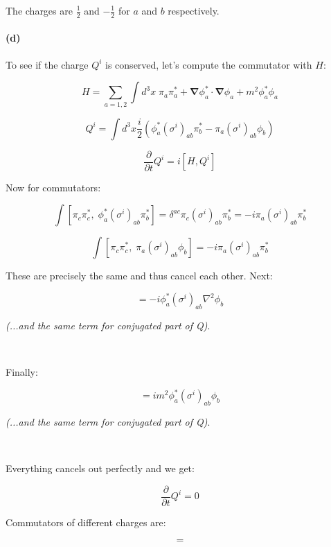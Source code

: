 \documentclass[11pt]{article}
\begin{document}
The charges are $\frac{1}{2}$ and $-\frac{1}{2}$ for $a$ and $b$
respectively.

\pagebreak

\paragraph*{(d)}

To see if the charge $Q^i$ is conserved, let's compute the commutator
with $H$:

\begin{equation}
H = \sum_{a=1,2} \int d^3x \; \pi_a \pi_a^* +
    \mathbf{\nabla} \phi_a^* \cdot \mathbf{\nabla} \phi_a +
    m^2 \phi_a^* \phi_a
\end{equation}
    
\begin{equation}
Q^i = \int d^3x \frac{i}{2} \left(
  \phi_a^* \left( \sigma^i \right)_{ab} \pi_b^* -
  \pi_a \left( \sigma^i \right)_{ab} \phi_b
  \right)
\end{equation}

\begin{equation}
\frac{\partial}{\partial t} Q^i = i [ H, Q^i ]
\end{equation}

Now for commutators:

\begin{equation}
\int
  [ \pi_c \pi^*_c, \; \phi^*_a \left(\sigma^i\right)_{ab} \pi^*_b ] =
  \delta^{ac} \pi_c \left(\sigma^i\right)_{ab} \pi^*_b =
  -i \pi_a \left(\sigma^i\right)_{ab} \pi^*_b
\end{equation}

\begin{equation}
\int
  [ \pi_c \pi^*_c, \; \pi_a \left(\sigma^i\right)_{ab} \phi_b ] =
  -i \pi_a \left(\sigma^i\right)_{ab} \pi^*_b
\end{equation}

These are precisely the same and thus cancel each other. Next:

\begin{equation}
[ \nabla \phi^*_c \cdot \nabla \phi_c,
  \; \phi^*_a \left(\sigma^i\right)_{ab} \pi^*_b] =
  -i \phi^*_a \left(\sigma^i\right)_{ab} \nabla^2 \phi_b
\end{equation}

\textit{(...and the same term for conjugated part of Q)}.

\

Finally:

\begin{equation}
[ m^2 \phi^*_c \phi_c,
  \; \phi^*_a \left(\sigma^i\right)_{ab} \pi^*_b ] =
  i m^2 \phi^*_a \left(\sigma^i\right)_{ab} \phi_b
\end{equation}
  
\textit{(...and the same term for conjugated part of Q)}.

\

Everything cancels out perfectly and we get:

\begin{equation}
\frac{\partial}{\partial t} Q^i = 0
\end{equation}

Commutators of different charges are:

\begin{equation}
[ Q^i, Q^j ] = 
\end{equation}
\end{document}
